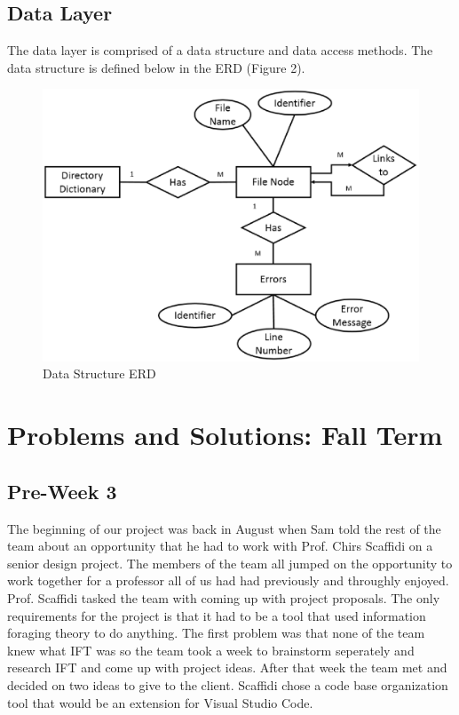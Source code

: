\documentclass[letterpaper,10pt,titlepage,draftclsnofoot,onecolumn,onesided] {IEEEtran}
\begin{document}
\subsection{Data Layer}
The data layer is comprised of a data structure and data access methods.
The data structure is defined below in the ERD (Figure 2).
\begin{figure}
	\includegraphics[width=450px]{InformationERDEPS}
	\caption{Data Structure ERD}
\end{figure}

\section{Problems and Solutions: Fall Term}
	\subsection{Pre-Week 3}
	The beginning of our project was back in August when Sam told the rest of the team about an opportunity that he had to work with Prof. Chirs Scaffidi on a senior design project. 
	The members of the team all jumped on the opportunity to work together for a professor all of us had had previously and throughly enjoyed.
	Prof. Scaffidi tasked the team with coming up with project proposals.
	The only requirements for the project is that it had to be a tool that used information foraging theory to do anything.
	The first problem was that none of the team knew what IFT was so the team took a week to brainstorm seperately and research IFT and come up with project ideas.
	After that week the team met and decided on two ideas to give to the client.
	Scaffidi chose a code base organization tool that would be an extension for Visual Studio Code.
	
\end{document}
